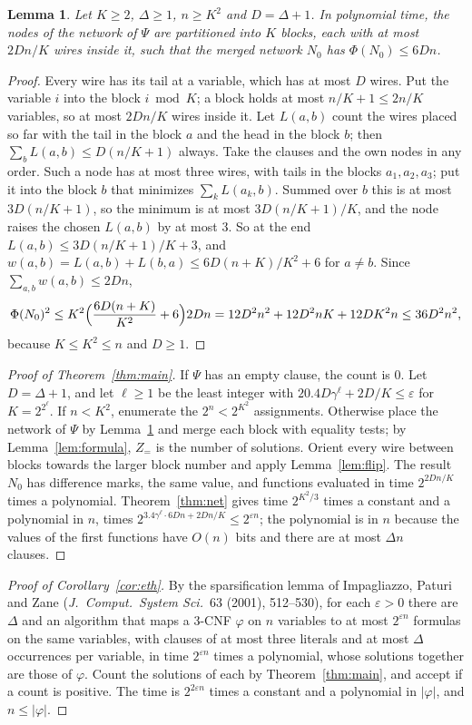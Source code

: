\documentclass[10pt]{article}
\newtheorem{lemma}[theorem]{Lemma}
\begin{document}
\begin{lemma}\label{lem:place}
Let $K\ge2$, $\Delta\ge1$, $n\ge K^2$ and $D=\Delta+1$. In polynomial time, the nodes of the network of $\Psi$ are partitioned into $K$ blocks, each with at most $2Dn/K$ wires inside it, such that the merged network $N_0$ has $\Phi(N_0)\le6Dn$.
\end{lemma}
\begin{proof}
Every wire has its tail at a variable, which has at most $D$ wires. Put the variable $i$ into the block $i\bmod K$; a block holds at most $n/K+1\le2n/K$ variables, so at most $2Dn/K$ wires inside it. Let $L(a,b)$ count the wires placed so far with the tail in the block $a$ and the head in the block $b$; then $\sum_bL(a,b)\le D(n/K+1)$ always. Take the clauses and the own nodes in any order. Such a node has at most three wires, with tails in the blocks $a_1,a_2,a_3$; put it into the block $b$ that minimizes $\sum_kL(a_k,b)$. Summed over $b$ this is at most $3D(n/K+1)$, so the minimum is at most $3D(n/K+1)/K$, and the node raises the chosen $L(a,b)$ by at most $3$. So at the end $L(a,b)\le3D(n/K+1)/K+3$, and $w(a,b)=L(a,b)+L(b,a)\le6D(n+K)/K^2+6$ for $a\ne b$. Since $\sum_{a,b}w(a,b)\le2Dn$,
\[
\Phi(N_0)^2\le K^2\Bigl(\frac{6D(n+K)}{K^2}+6\Bigr)2Dn=12D^2n^2+12D^2nK+12DK^2n\le36D^2n^2,
\]
because $K\le K^2\le n$ and $D\ge1$.
\end{proof}

\begin{proof}[Proof of Theorem~\ref{thm:main}]
If $\Psi$ has an empty clause, the count is $0$. Let $D=\Delta+1$, and let $\ell\ge1$ be the least integer with $20.4D\gamma^\ell+2D/K\le\varepsilon$ for $K=2^{2^\ell}$. If $n<K^2$, enumerate the $2^n<2^{K^2}$ assignments. Otherwise place the network of $\Psi$ by Lemma~\ref{lem:place} and merge each block with equality tests; by Lemma~\ref{lem:formula}, $Z_=$ is the number of solutions. Orient every wire between blocks towards the larger block number and apply Lemma~\ref{lem:flip}. The result $N_0$ has difference marks, the same value, and functions evaluated in time $2^{2Dn/K}$ times a polynomial. Theorem~\ref{thm:net} gives time $2^{K^2/3}$ times a constant and a polynomial in $n$, times $2^{3.4\gamma^\ell\cdot6Dn+2Dn/K}\le2^{\varepsilon n}$; the polynomial is in $n$ because the values of the first functions have $O(n)$ bits and there are at most $\Delta n$ clauses.
\end{proof}

\begin{proof}[Proof of Corollary~\ref{cor:eth}]
By the sparsification lemma of Impagliazzo, Paturi and Zane (\emph{J.\ Comput.\ System Sci.}\ 63 (2001), 512--530), for each $\varepsilon>0$ there are $\Delta$ and an algorithm that maps a 3-CNF $\varphi$ on $n$ variables to at most $2^{\varepsilon n}$ formulas on the same variables, with clauses of at most three literals and at most $\Delta$ occurrences per variable, in time $2^{\varepsilon n}$ times a polynomial, whose solutions together are those of $\varphi$. Count the solutions of each by Theorem~\ref{thm:main}, and accept if a count is positive. The time is $2^{2\varepsilon n}$ times a constant and a polynomial in $|\varphi|$, and $n\le|\varphi|$.
\end{proof}
\end{document}
